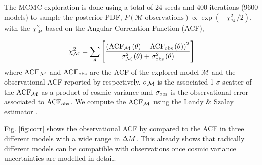 \documentclass{emulateapj}
\newcommand{\dm}{{\ifmmode{{\Delta M}}\else{$\Delta M$}\fi}}
\begin{document}
The MCMC exploration is done using a total of 24 seeds and 400
iterations (9600 models) to sample the posterior PDF,
$P(\mathcal{M}|\mathrm{observations}) \propto \exp(-\chi_{\mathcal
  M}^2/2)$, with the $\chi_{\mathcal{M}}^2$ based on the Angular
Correlation Function (ACF), 

\begin{equation}
\chi_{\mathcal M}^2=
\sum_{\theta}\left[\frac{\left( \rm{ACF}_{\mathcal
      M}\left(\theta\right) - \rm{ACF}_{\rm
      obs}\left(\theta\right)\right)^2}{ \sigma_{\rm \mathcal
      M}^{2}\left(\theta\right) + \sigma_{\rm
      obs}^{2}\left(\theta\right)}\right] 
\end{equation}
%
where  $\rm{ACF}_{\mathcal M}$ and  $\rm{ACF}_{\rm obs}$ are the ACF
of the explored model ${\mathcal M}$ and the observational ACF
reported by \citet{Bielby16} respectively. 
$\sigma_{\rm \mathcal M}$ is the associated 1-$\sigma$ scatter  of the
$\rm{ACF}_{\mathcal M}$ as a product of cosmic variance and
$\sigma_{\rm obs}$ is the observational error associated to
$\rm{ACF}_{\rm obs}$.   
We compute the $\rm{ACF}_{\mathcal M}$ using the Landy \&  Szalay
estimator  \citep{Landy1993}.   

Fig. \ref{fig:corr} shows the observational ACF by
\citet{Bielby16} compared to the ACF in three different models with a
wide range in $\dm$.  
This already shows that radically different models can be compatible
with observations once cosmic variance uncertainties are modelled in
detail. 
\end{document}

